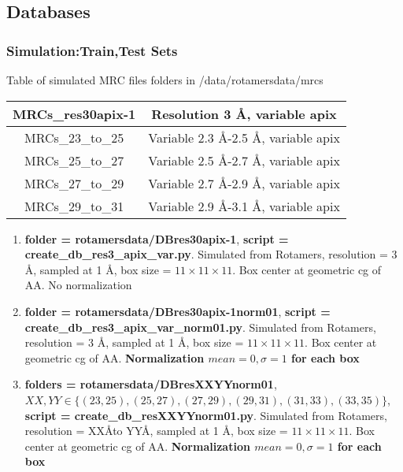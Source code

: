 \subsection{Databases}


\subsubsection{Simulation:Train,Test Sets}

Table of simulated MRC files folders in /data/rotamersdata/mrcs
\begin{center}
\begin{tabular}{ |c|c| } 
 \hline
 MRCs\_res30apix-1 & Resolution 3 \AA, variable apix  \\ 
 \hline
 MRCs\_23\_to\_25 & Variable 2.3 \AA-2.5 \AA, variable apix  \\ 
 \hline
 MRCs\_25\_to\_27 & Variable 2.5 \AA-2.7 \AA, variable apix  \\ 
 \hline
 MRCs\_27\_to\_29 & Variable 2.7 \AA-2.9 \AA, variable apix  \\ 
 \hline
 MRCs\_29\_to\_31 & Variable 2.9 \AA-3.1 \AA, variable apix  \\ 
 \hline
\end{tabular}
\end{center}

\begin{enumerate}
\item \textbf{folder = rotamersdata/DBres30apix-1}, \textbf{script = create\_db\_res3\_apix\_var.py}. Simulated from  Rotamers, resolution = 3 \AA, sampled at 1 \AA, box size = $11 \times 11 \times 11$. Box center at geometric cg of AA. No normalization

\item \textbf{folder = rotamersdata/DBres30apix-1norm01}, \textbf{script = create\_db\_res3\_apix\_var\_norm01.py}. Simulated from  Rotamers, resolution = 3 \AA, sampled at 1 \AA, box size = $11 \times 11 \times 11$. Box center at geometric cg of AA. \textbf{Normalization $mean=0, \sigma =1$ for each box}

\item \textbf{folders = rotamersdata/DBresXXYYnorm01}, \newline $XX,YY \in \{(23,25),(25,27),(27,29),(29,31),(31,33),(33,35)\}$, \textbf{script = create\_db\_resXXYYnorm01.py}. Simulated from  Rotamers, resolution = XX\AA to YY\AA, sampled at 1 \AA, box size = $11 \times 11 \times 11$. Box center at geometric cg of AA. \textbf{Normalization $mean=0, \sigma =1$ for each box}
\end{enumerate}

